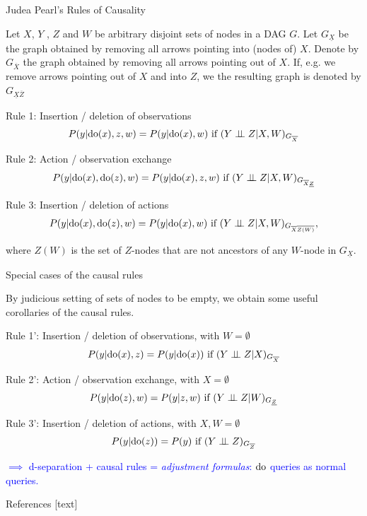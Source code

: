 \begin{frame}{Judea Pearl's Rules of Causality}

    Let $X$, $Y$ , $Z$ and $W$ be arbitrary disjoint sets of nodes in a DAG $G$. Let $G_\underline{X}$ be the graph obtained by removing all arrows pointing into (nodes of) $X$.
    Denote by $G_{\overline{X}}$ the graph obtained by removing all arrows pointing out of $X$. If, e.g. we remove arrows pointing out of $X$ and into $Z$, we the resulting graph is denoted by $G_{\underline{X} \overline{Z}}$

    Rule 1: Insertion / deletion of observations
    \begin{equation*}
        P(y | \mathrm{do}(x), z, w) = P(y | \mathrm{do}(x), w) \textrm{ if } (Y \perp\!\!\!\perp Z | X, W)_{G_{\overline{X}}}
    \end{equation*}

    Rule 2: Action / observation exchange
    \begin{equation*}
        P(y | \mathrm{do}(x), \mathrm{do}(z), w) = P(y | \mathrm{do}(x), z, w) \textrm{ if } (Y \perp\!\!\!\perp Z | X, W)_{G_{\overline{X} \underline{Z}}}
    \end{equation*}

    Rule 3: Insertion / deletion of actions
    \begin{equation*}
        P(y | \mathrm{do}(x), \mathrm{do}(z), w) = P(y | \mathrm{do}(x), w) \textrm{ if } (Y \perp\!\!\!\perp Z | X, W)_{G_{\overline{X} \overline{Z(W)}}},
    \end{equation*}

    where $Z(W)$ is the set of $Z$-nodes that are not ancestors of any $W$-node in $G_\underline{X}$.

\end{frame}


\begin{frame}{Special cases of the causal rules}

    By judicious setting of sets of nodes to be empty, we obtain some useful corollaries of the causal rules.
    \newline

    Rule 1': Insertion / deletion of observations, with $W = \emptyset$
    \begin{equation*}
        P(y | \mathrm{do}(x), z) = P(y | \mathrm{do}(x)) \textrm{ if } (Y \perp\!\!\!\perp Z | X)_{G_{\overline{X}}}
    \end{equation*}

    Rule 2': Action / observation exchange, with $X = \emptyset$
    \begin{equation*}
        P(y | \mathrm{do}(z), w) = P(y | z, w) \textrm{ if } (Y \perp\!\!\!\perp Z | W)_{G_{ \underline{Z}}}
    \end{equation*}

    Rule 3': Insertion / deletion of actions, with $X, W = \emptyset$
    \begin{equation*}
        P(y | \mathrm{do}(z)) = P(y) \textrm{ if } (Y \perp\!\!\!\perp Z )_{G_{\overline{Z}}}
    \end{equation*}

    \textcolor{blue}{$\implies$ d-separation + causal rules = \emph{adjustment formulas}: $\mathrm{do}$ queries as normal queries.}
\end{frame}

\begin{frame}[allowframebreaks]{References}
    [text]
    
    
\end{frame}

